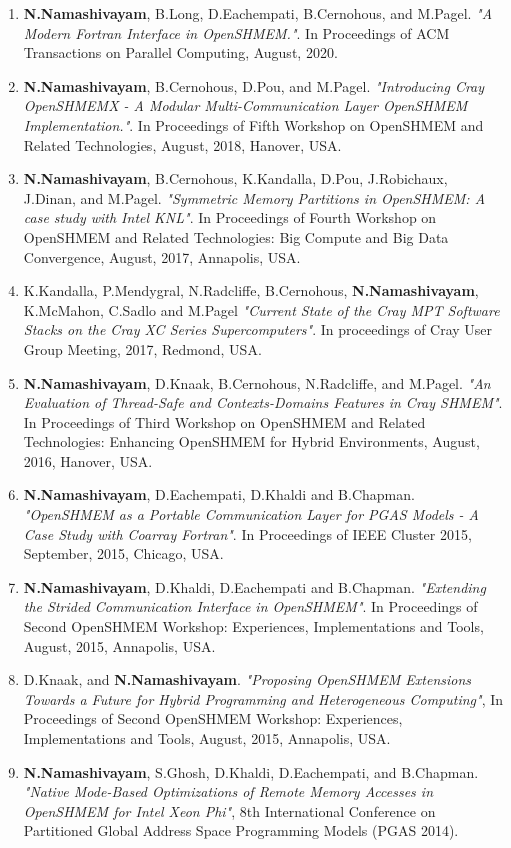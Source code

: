 \begin{enumerate}
\setcounter{enumi}{0}
\item \textbf{N.Namashivayam}, B.Long, D.Eachempati, B.Cernohous, and M.Pagel.
      \textit{"A Modern Fortran Interface in OpenSHMEM."}. In Proceedings of
      ACM Transactions on Parallel Computing, August, 2020.
\item \textbf{N.Namashivayam}, B.Cernohous, D.Pou, and M.Pagel.
      \textit{"Introducing Cray OpenSHMEMX - A Modular Multi-Communication Layer
      OpenSHMEM Implementation."}. In Proceedings of Fifth Workshop on OpenSHMEM
      and Related Technologies, August, 2018, Hanover, USA.
\item \textbf{N.Namashivayam}, B.Cernohous, K.Kandalla, D.Pou, J.Robichaux,
      J.Dinan, and M.Pagel.
      \textit{"Symmetric Memory Partitions in OpenSHMEM: A case study with
      Intel KNL"}. In Proceedings of Fourth Workshop on OpenSHMEM and
      Related Technologies: Big Compute and Big Data Convergence, August,
      2017, Annapolis, USA.
\item K.Kandalla, P.Mendygral, N.Radcliffe, B.Cernohous,
      \textbf{N.Namashivayam}, K.McMahon, C.Sadlo and M.Pagel
      \textit{"Current State of the Cray MPT Software Stacks on the Cray XC
      Series Supercomputers"}. In proceedings of Cray User Group Meeting,
      2017, Redmond, USA.
\item \textbf{N.Namashivayam}, D.Knaak, B.Cernohous, N.Radcliffe, and
      M.Pagel.
      \textit{"An Evaluation of Thread-Safe and Contexts-Domains Features in
      Cray SHMEM"}. In Proceedings of Third Workshop on OpenSHMEM and Related
      Technologies: Enhancing OpenSHMEM for Hybrid Environments, August, 2016,
      Hanover, USA.
\item \textbf{N.Namashivayam}, D.Eachempati, D.Khaldi and B.Chapman.
      \textit{"OpenSHMEM as a Portable Communication Layer for PGAS Models - A
      Case Study with Coarray Fortran"}. In Proceedings of IEEE Cluster 2015,
      September, 2015, Chicago, USA.
\item \textbf{N.Namashivayam}, D.Khaldi, D.Eachempati and B.Chapman.
      \textit{"Extending the Strided Communication Interface in OpenSHMEM"}. In
      Proceedings of Second OpenSHMEM Workshop: Experiences, Implementations and
      Tools, August, 2015, Annapolis, USA.
\item D.Knaak, and \textbf{N.Namashivayam}.
      \textit{"Proposing OpenSHMEM Extensions Towards a Future for Hybrid
      Programming and Heterogeneous Computing"}, In Proceedings of Second
      OpenSHMEM Workshop: Experiences, Implementations and Tools, August, 2015,
      Annapolis, USA.
\item \textbf{N.Namashivayam}, S.Ghosh, D.Khaldi, D.Eachempati, and B.Chapman.
      \textit{"Native Mode-Based Optimizations of Remote Memory Accesses in
      OpenSHMEM for Intel Xeon Phi"}, 8th International Conference on Partitioned
      Global Address Space Programming Models (PGAS 2014).
\end{enumerate}



